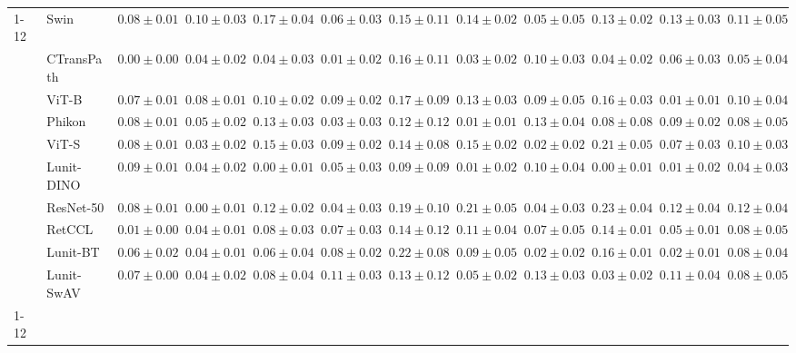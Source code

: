 \begin{tabular}{ll|cccc|c|cccc|c}
\cline{1-12}
\multirow[t]{10}{*}{Mean pool} & Swin & $0.08 \pm 0.01$ & $0.10 \pm 0.03$ & $0.17 \pm 0.04$ & $0.06 \pm 0.03$ & $0.15 \pm 0.11$ & $0.14 \pm 0.02$ & $0.05 \pm 0.05$ & $0.13 \pm 0.02$ & $0.13 \pm 0.03$ & $0.11 \pm 0.05$ \\
 & CTransPath & $\mathbf{0.00 \pm 0.00}$ & $0.04 \pm 0.02$ & $0.04 \pm 0.03$ & $\mathbf{0.01 \pm 0.02}$ & $0.16 \pm 0.11$ & $0.03 \pm 0.02$ & $0.10 \pm 0.03$ & $0.04 \pm 0.02$ & $0.06 \pm 0.03$ & $0.05 \pm 0.04$ \\
 & ViT-B & $0.07 \pm 0.01$ & $0.08 \pm 0.01$ & $0.10 \pm 0.02$ & $0.09 \pm 0.02$ & $0.17 \pm 0.09$ & $0.13 \pm 0.03$ & $0.09 \pm 0.05$ & $0.16 \pm 0.03$ & $\mathbf{0.01 \pm 0.01}$ & $0.10 \pm 0.04$ \\
 & Phikon & $0.08 \pm 0.01$ & $0.05 \pm 0.02$ & $0.13 \pm 0.03$ & $0.03 \pm 0.03$ & $0.12 \pm 0.12$ & $\mathbf{0.01 \pm 0.01}$ & $0.13 \pm 0.04$ & $0.08 \pm 0.08$ & $0.09 \pm 0.02$ & $0.08 \pm 0.05$ \\
 & ViT-S & $0.08 \pm 0.01$ & $0.03 \pm 0.02$ & $0.15 \pm 0.03$ & $0.09 \pm 0.02$ & $0.14 \pm 0.08$ & $0.15 \pm 0.02$ & $\mathbf{0.02 \pm 0.02}$ & $0.21 \pm 0.05$ & $0.07 \pm 0.03$ & $0.10 \pm 0.03$ \\
 & Lunit-DINO & $0.09 \pm 0.01$ & $0.04 \pm 0.02$ & $\mathbf{0.00 \pm 0.01}$ & $0.05 \pm 0.03$ & $\mathbf{0.09 \pm 0.09}$ & $0.01 \pm 0.02$ & $0.10 \pm 0.04$ & $\mathbf{0.00 \pm 0.01}$ & $0.01 \pm 0.02$ & $\mathbf{0.04 \pm 0.03}$ \\
 & ResNet-50 & $0.08 \pm 0.01$ & $\mathbf{0.00 \pm 0.01}$ & $0.12 \pm 0.02$ & $0.04 \pm 0.03$ & $0.19 \pm 0.10$ & $0.21 \pm 0.05$ & $0.04 \pm 0.03$ & $0.23 \pm 0.04$ & $0.12 \pm 0.04$ & $0.12 \pm 0.04$ \\
 & RetCCL & $0.01 \pm 0.00$ & $0.04 \pm 0.01$ & $0.08 \pm 0.03$ & $0.07 \pm 0.03$ & $0.14 \pm 0.12$ & $0.11 \pm 0.04$ & $0.07 \pm 0.05$ & $0.14 \pm 0.01$ & $0.05 \pm 0.01$ & $0.08 \pm 0.05$ \\
 & Lunit-BT & $0.06 \pm 0.02$ & $0.04 \pm 0.01$ & $0.06 \pm 0.04$ & $0.08 \pm 0.02$ & $0.22 \pm 0.08$ & $0.09 \pm 0.05$ & $0.02 \pm 0.02$ & $0.16 \pm 0.01$ & $0.02 \pm 0.01$ & $0.08 \pm 0.04$ \\
 & Lunit-SwAV & $0.07 \pm 0.00$ & $0.04 \pm 0.02$ & $0.08 \pm 0.04$ & $0.11 \pm 0.03$ & $0.13 \pm 0.12$ & $0.05 \pm 0.02$ & $0.13 \pm 0.03$ & $0.03 \pm 0.02$ & $0.11 \pm 0.04$ & $0.08 \pm 0.05$ \\
\cline{1-12}
\bottomrule
\end{tabular}
